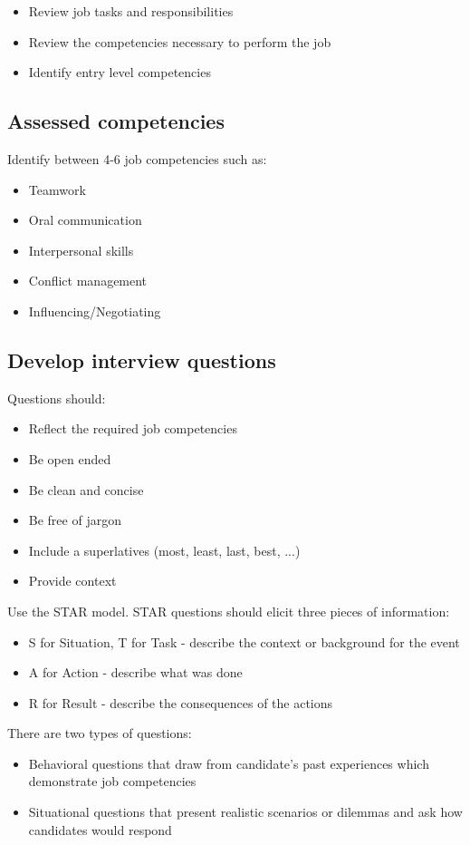\documentclass{article}
\begin{document}
\begin{itemize}
  \item Review job tasks and responsibilities
  \item Review the competencies necessary to perform the job
  \item Identify entry level competencies
\end{itemize}


\subsection{Assessed competencies}

Identify between 4-6 job competencies such as:
\begin{itemize}
  \item Teamwork
  \item Oral communication
  \item Interpersonal skills
  \item Conflict management
  \item Influencing/Negotiating
\end{itemize}


\subsection{Develop interview questions}

Questions should:
\begin{itemize}
  \item Reflect the required job competencies
  \item Be open ended
  \item Be clean and concise
  \item Be free of jargon
  \item Include a superlatives (most, least, last, best, ...)
  \item Provide context
\end{itemize}

Use the STAR model. STAR questions should elicit three pieces of information:
\begin{itemize}
  \item S for Situation, T for Task - describe the context or background for the event
  \item A for Action - describe what was done
  \item R for Result - describe the consequences of the actions
\end{itemize}

There are two types of questions:
\begin{itemize}
  \item Behavioral questions that draw from candidate's past experiences which demonstrate job competencies
  \item Situational questions that present realistic scenarios or dilemmas and ask how candidates would respond
\end{itemize}
\end{document}
